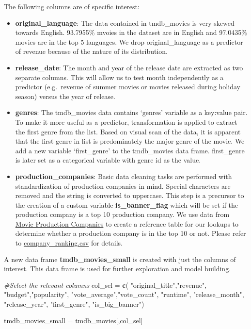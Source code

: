 \documentclass[
]{article}
\newenvironment{Shaded}{\begin{snugshade}}{\end{snugshade}}
\newcommand{\CommentTok}[1]{\textcolor[rgb]{0.56,0.35,0.01}{\textit{#1}}}
\newcommand{\KeywordTok}[1]{\textcolor[rgb]{0.13,0.29,0.53}{\textbf{#1}}}
\newcommand{\NormalTok}[1]{#1}
\newcommand{\StringTok}[1]{\textcolor[rgb]{0.31,0.60,0.02}{#1}}
\providecommand{\tightlist}{%
  \setlength{\itemsep}{0pt}\setlength{\parskip}{0pt}}
\begin{document}
The following columns are of specific interest:

\begin{itemize}
\tightlist
\item
  \textbf{original\_language}: The data contained in tmdb\_movies is
  very skewed towards English. 93.7955\% mvoies in the dataset are in
  English and 97.0435\% movies are in the top 5 languages. We drop
  original\_language as a predictor of revenue because of the nature of
  its distribution.
\item
  \textbf{release\_date}: The month and year of the release date are
  extracted as two separate columns. This will allow us to test month
  independently as a predictor (e.g.~revenue of summer movies or movies
  released during holiday season) versus the year of release.
\item
  \textbf{genres}: The tmdb\_movies data contains `genres' variable as a
  key:value pair. To make it more useful as a predictor, transformation
  is applied to extract the first genre from the list. Based on visual
  scan of the data, it is apparent that the first genre in list is
  predominately the major genre of the movie. We add a new variable
  `first\_genre' to the tmdb\_movies data frame. first\_genre is later
  set as a categorical variable with genre id as the value.
\item
  \textbf{production\_companies}: Basic data cleaning tasks are
  performed with standardization of production companies in mind.
  Special characters are removed and the string is converted to
  uppercase. This step is a precursor to the creation of a custom
  variable \textbf{is\_banner\_flag} which will be set if the production
  company is a top 10 production company. We use data from
  \href{https://www.the-numbers.com/movies/production-companies/}{Movie
  Production Companies} to create a reference table for our lookups to
  determine whether a production company is in the top 10 or not. Please
  refer to \url{company_ranking.csv} for details.
\end{itemize}

A new data frame \textbf{tmdb\_movies\_small} is created with just the
columns of interest. This data frame is used for further exploration and
model building.

\begin{Shaded}
\begin{Highlighting}[]
\CommentTok{#Select the relevant columns}
\NormalTok{col_sel =}\StringTok{ }\KeywordTok{c}\NormalTok{( }\StringTok{"original_title"}\NormalTok{,}\StringTok{"revenue"}\NormalTok{, }\StringTok{"budget"}\NormalTok{,}\StringTok{"popularity"}\NormalTok{,}
             \StringTok{"vote_average"}\NormalTok{,}\StringTok{"vote_count"}\NormalTok{, }\StringTok{"runtime"}\NormalTok{,}
             \StringTok{"release_month"}\NormalTok{, }\StringTok{"release_year"}\NormalTok{,}
             \StringTok{"first_genre"}\NormalTok{, }\StringTok{"is_big_banner"}\NormalTok{)}

\NormalTok{tmdb_movies_small =}\StringTok{ }\NormalTok{tmdb_movies[,col_sel]}
\end{Highlighting}
\end{Shaded}
\end{document}
